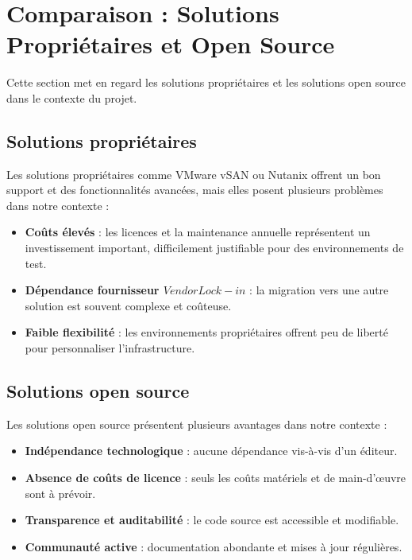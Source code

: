 \section{Comparaison : Solutions Propriétaires et Open Source}

\par Cette section met en regard les solutions propriétaires et les solutions open source dans le contexte du projet.\\

\subsection{Solutions propriétaires}

\par Les solutions propriétaires comme VMware vSAN ou Nutanix offrent un bon support et des fonctionnalités avancées, mais elles posent plusieurs problèmes dans notre contexte :\\

\begin{itemize}

    \item \textbf{Coûts élevés} : les licences et la maintenance annuelle représentent un investissement important, difficilement justifiable pour des environnements de test.

    \item \textbf{Dépendance fournisseur \(Vendor Lock-in\)} : la migration vers une autre solution est souvent complexe et coûteuse.

    \item \textbf{Faible flexibilité} : les environnements propriétaires offrent peu de liberté pour personnaliser l'infrastructure.

\end{itemize}

\subsection{Solutions open source}

\par Les solutions open source présentent plusieurs avantages dans notre contexte :\\

\begin{itemize}

    \item \textbf{Indépendance technologique} : aucune dépendance vis-à-vis d'un éditeur.

    \item \textbf{Absence de coûts de licence} : seuls les coûts matériels et de main-d'\oe{}uvre sont à prévoir.

    \item \textbf{Transparence et auditabilité} : le code source est accessible et modifiable.

    \item \textbf{Communauté active} : documentation abondante et mises à jour régulières.

\end{itemize}

